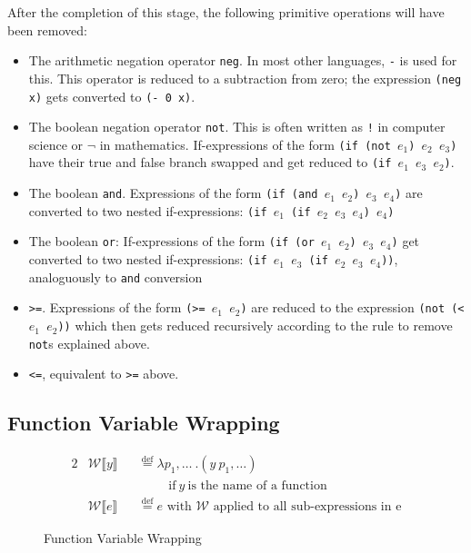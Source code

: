 \documentclass[11pt]{report}
\newcommand{\eqdef}{\stackrel{\text{def}}{=}}%
\begin{document}
After the completion of this stage, the following primitive operations will have been removed: 
\begin{itemize}
\item The arithmetic negation operator \texttt{neg}. In most other languages, \texttt{-} is used for this. This operator is reduced to a subtraction from zero; the expression \texttt{(neg x)} gets converted to \texttt{(- 0 x)}.
\item The boolean negation operator \texttt{not}. This is often written as \texttt{!} in computer science or $\neg$ in mathematics. If-expressions of the form \texttt{(if (not $e_1$) $e_2$ $e_3$)} have their true and false branch swapped and get reduced to \texttt{(if $e_1$ $e_3$ $e_2$)}.
\item The boolean \texttt{and}. Expressions of the form \texttt{(if (and $e_1$ $e_2$) $e_3$ $e_4$)} are converted to two nested if-expressions: \texttt{(if $e_1$ (if $e_2$ $e_3$ $e_4$) $e_4$)}
\item The boolean \texttt{or}: If-expressions of the form \texttt{(if (or $e_1$ $e_2$) $e_3$ $e_4$)} get converted to two nested if-expressions: \texttt{(if $e_1$ $e_3$ (if $e_2$ $e_3$ $e_4$))}, analoguously to \texttt{and} conversion
\item \texttt{>=}. Expressions of the form \texttt{(>= $e_1$ $e_2$)} are reduced to the expression \texttt{(not (< $e_1$ $e_2$))} which then gets reduced recursively according to the rule to remove \texttt{not}s explained above.
\item \texttt{<=}, equivalent to \texttt{>=} above.
\end{itemize}

\subsection{Function Variable Wrapping}
\begin{figure}[ht]
\begin{alignat*}{2}
&\mathcal{W}\llbracket y \rrbracket && \eqdef \lambda p_1,\dots~.(y~p_1,\dots)\\
&&&\hspace{1cm}\text{if}~y~\text{is the name of a function}\\
&\mathcal{W}\llbracket e \rrbracket && \eqdef e\text{ with $\mathcal{W}$ applied to all sub-expressions in e}
\end{alignat*}
\caption{Function Variable Wrapping}
\label{fvarwrapping}
\end{figure}
\end{document}
